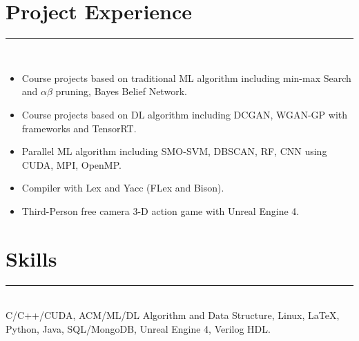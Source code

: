 \documentclass[a4paper]{article}
\begin{document}
		\section*{Project Experience}
		\rule[1pt]{19cm}{0.01em}\\
		\begin{itemize}
		\item Course projects based on traditional ML algorithm including min-max Search and $ \alpha\beta $ pruning, Bayes Belief Network.
		\item Course projects based on DL algorithm including DCGAN, WGAN-GP with frameworks and TensorRT.
		\item Parallel ML algorithm including SMO-SVM, DBSCAN, RF, CNN using CUDA, MPI, OpenMP.
		\item Compiler with Lex and Yacc (FLex and Bison).
		\item Third-Person free camera 3-D action game with Unreal Engine 4.
		\end{itemize}
		\section*{Skills}
		\rule[1pt]{19cm}{0.01em}\\
		C/C++/CUDA, ACM/ML/DL Algorithm and Data Structure, Linux, \LaTeX, Python, Java, SQL/MongoDB, Unreal Engine 4, Verilog HDL.
		
	
\end{document}
